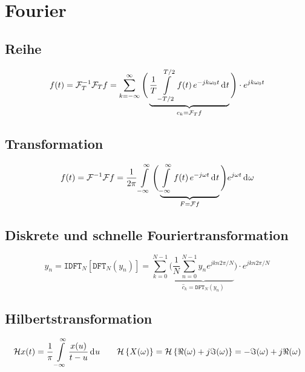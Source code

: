 \section{Fourier}
\subsection{Reihe}
\[
  f(t) = \mathcal{F}^{-1}_T \mathcal{F}_T f =
  \sum_{k=-\infty}^{\infty}
    \Bigg( \underbrace{
      \frac{1}{T} \int\limits_{-T/2}^{T/2} f(t) \, e^{-jk\omega_0 t} \,\mathrm{d}^{} t
    }_{c_k = \mathcal{F}_T f} \Bigg) \cdot
  e^{jk\omega_0 t}
\]

\subsection{Transformation}
\[
  f(t) = \mathcal{F}^{-1} \mathcal{F} f =
  \frac{1}{2\pi} \int\limits_{-\infty}^\infty
    \Bigg( \underbrace{
      \int\limits_{-\infty}^{\infty} f(t) \, e^{-j\omega t} \,\mathrm{d}^{} t
    }_{F = \mathcal{F} f} \Bigg)
  e^{j\omega t} \,\mathrm{d}^{} \omega
\]

\subsection{Diskrete und schnelle Fouriertransformation}
\[
  y_n = \mathtt{IDFT}_N\left[\mathtt{DFT}_N(y_n) \right] =
  \sum_{k=0}^{N-1}
    \Bigg( \underbrace{
      \frac{1}{N}\sum_{n=0}^{N-1} y_n e^{jkn2\pi /N}
    }_{\hat{c}_k = \mathtt{DFT}_N (y_n)} \Bigg) \cdot
  e^{jkn2\pi /N}
\]

\subsection{Hilbertstransformation}
\[
  \mathcal{H} x(t) = \frac{1}{\pi} \int\limits_{-\infty}^{\infty}
    \frac{x(u)}{t - u} \,\mathrm{d}^{} u
  \qquad
  \mathcal{H} \left\{ X(\omega) \right\}
    = \mathcal{H} \left\{ \Re(\omega) + j\Im(\omega) \right\}
    = - \Im(\omega) + j\Re(\omega)
\]
